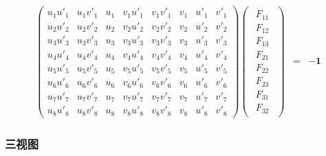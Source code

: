 \documentclass{beamer}
\newcommand{\tmmathbf}[1]{\ensuremath{\boldsymbol{#1}}}
\begin{document}
{{\begin{frame}
  
  \begin{eqnarray*}
    \left(\begin{array}{cccccccc}
      u_1 u'_1 & u_1 v'_1 & u_1 & v_1 u'_1 & v_1 v'_1 & v_1 & u'_1 & v'_1\\
      u_2 u'_2 & u_2 v'_2 & u_2 & v_2 u'_2 & v_2 v'_2 & v_2 & u'_2 & v'_2\\
      u_3 u'_3 & u_3 v'_3 & u_3 & v_3 u'_3 & v_3 v'_3 & v_3 & u'_3 & v'_3\\
      u_4 u'_4 & u_4 v'_4 & u_4 & v_4 u'_4 & v_4 v'_4 & v_4 & u'_4 & v'_4\\
      u_5 u'_5 & u_5 v'_5 & u_5 & v_5 u'_5 & v_5 v'_5 & v_5 & u'_5 & v'_5\\
      u_6 u'_6 & u_6 v'_6 & u_6 & v_6 u'_6 & v_6 v'_6 & v_6 & u'_6 & v'_6\\
      u_7 u'_7 & u_7 v'_7 & u_7 & v_7 u'_7 & v_7 v'_7 & v_7 & u'_7 & v'_7\\
      u_8 u'_8 & u_8 v'_8 & u_8 & v_8 u'_8 & v_8 v'_8 & v_8 & u'_8 & v'_8
    \end{array}\right) \left(\begin{array}{c}
      \begin{array}{c}
        F_{11}\\
        F_{12}\\
        F_{13}\\
        F_{21}\\
        F_{22}\\
        F_{23}\\
        F_{31}\\
        F_{32}
      \end{array}
    \end{array}\right) & = & -\tmmathbf{1}
  \end{eqnarray*}
\end{frame}}{\begin{frame}
  \frametitle{三视图}
  

\end{frame}}}
\end{document}
